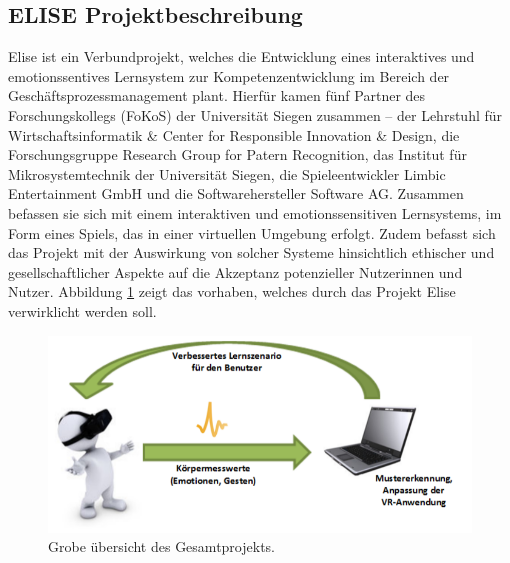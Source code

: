 \subsection{ELISE Projektbeschreibung} \label{elise-subsec}



Elise ist ein Verbundprojekt, welches die Entwicklung eines interaktives und emotionssentives Lernsystem zur Kompetenzentwicklung im Bereich der Gesch{\"a}ftsprozessmanagement plant. 
Hierf{\"u}r kamen f{\"u}nf Partner des Forschungskollegs (FoKoS) der Universit{\"a}t Siegen zusammen – der Lehrstuhl f{\"u}r Wirtschaftsinformatik \& Center for Responsible Innovation \& Design, die Forschungsgruppe Research Group for Patern Recognition, das Institut f{\"u}r Mikrosystemtechnik der Universit{\"a}t Siegen, die Spieleentwickler Limbic Entertainment GmbH und die Softwarehersteller Software AG. 
Zusammen befassen sie sich mit einem interaktiven und emotionssensitiven Lernsystems, im Form eines Spiels, das in einer virtuellen Umgebung erfolgt. 
Zudem befasst sich das Projekt mit der Auswirkung von solcher Systeme hinsichtlich ethischer und gesellschaftlicher Aspekte auf die Akzeptanz potenzieller Nutzerinnen und Nutzer. 
Abbildung \ref{fig-elise} zeigt das vorhaben, welches durch das Projekt Elise verwirklicht werden soll.


\begin{figure}[H] \centering
\includegraphics[width=12cm]{Images/elise_projektbeschreibung.png} 
\vspace{-0.3cm} 
\caption{Grobe {\"u}bersicht des Gesamtprojekts\cite{msckroenert}.}
\label{fig-elise} 
\end{figure}
